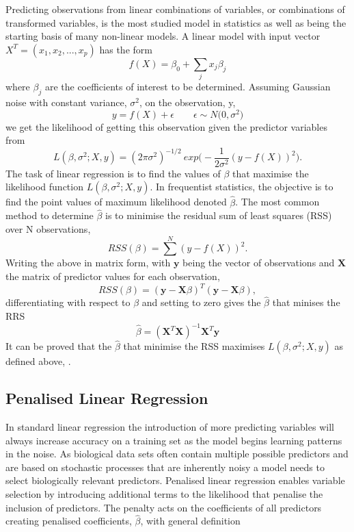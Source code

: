 \documentclass[../main.tex]{subfiles}
\begin{document}
Predicting observations from linear combinations of variables, or combinations of transformed variables, is the most studied model in statistics as well as being the starting basis of many non-linear models.
A linear model with input vector $X^T = (x_1, x_2, ..., x_p)$ has the form
$$f(X) = \beta_0 +\sum_j x_j\beta_j$$
where $\beta_j$ are the coefficients of interest to be determined.
Assuming Gaussian noise with constant variance, $\sigma^2$, on the observation, y, 
$$y = f(X) + \epsilon \qquad \epsilon \sim N \big(0,\sigma^2\big) $$
we get the likelihood of getting this observation given the predictor variables from
$$L(\beta,\sigma^2;X,y)=(2\pi\sigma^2)^{-1/2}\ exp\Big( -\frac{1}{2\sigma^2} (y-f(X))^2 \Big).$$
The task of linear regression is to find the values of $\beta$ that maximise the likelihood function $L(\beta,\sigma^2;X,y)$.
In frequentist statistics, the objective is to find the point values of maximum likelihood denoted $\hat\beta$.
The most common method to determine $\hat\beta$ is to minimise the residual sum of least squares (RSS) over N observations,
$$RSS(\beta) = \sum^N(y-f(X))^2.$$
Writing the above in matrix form, with $\mathbf{y}$ being the vector of observations and $\mathbf{X}$ the matrix of predictor values for each observation,
$$RSS(\beta) = (\mathbf{y}-\mathbf{X}\beta)^T(\mathbf{y}-\mathbf{X}\beta),$$
differentiating with respect to $\beta$ and setting to zero gives the $\hat\beta$ that minises the RRS
$$\hat\beta = (\mathbf{X}^T\mathbf{X})^{-1}\mathbf{X}^T\mathbf{y}$$
It can be proved that the $\hat\beta$ that minimise the RSS maximises $L(\beta,\sigma^2;X,y)$ as defined above, \parencite{Hastie2009}.

\subsection{Penalised Linear Regression}

In standard linear regression the introduction of more predicting variables will always increase accuracy on a training set as the model begins learning patterns in the noise.
As biological data sets often contain multiple possible predictors and are based on stochastic processes that are inherently noisy a model needs to select biologically relevant predictors.
Penalised linear regression enables variable selection by introducing additional terms to the likelihood that penalise the inclusion of predictors.
The penalty acts on the coefficients of all predictors creating penalised coefficients, $\hat{\beta}$, with general definition
\end{document}
